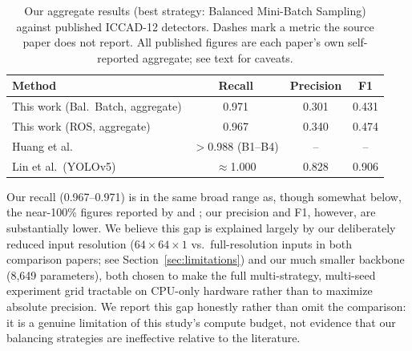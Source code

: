 \documentclass[conference]{IEEEtran}
\begin{document}
\begin{table}[H]
\centering
\caption{Our aggregate results (best strategy: Balanced Mini-Batch
Sampling) against published ICCAD-12 detectors. Dashes mark a metric
the source paper does not report. All published figures are each
paper's own self-reported aggregate; see text for caveats.}
\label{tab:published}
\begin{tabular}{lccc}
\toprule
Method & Recall & Precision & F1 \\
\midrule
This work (Bal.\ Batch, aggregate) & 0.971 & 0.301 & 0.431 \\
This work (ROS, aggregate) & 0.967 & 0.340 & 0.474 \\
Huang et al.\ \cite{huang2021enhancements} & $>$0.988 (B1--B4) & -- & -- \\
Lin et al.\ (YOLOv5) \cite{lin2025yolov5} & $\approx$1.000 & 0.828 & 0.906 \\
\bottomrule
\end{tabular}
\end{table}

Our recall (0.967--0.971) is in the same broad range as, though
somewhat below, the near-100\% figures reported by
\cite{huang2021enhancements} and \cite{lin2025yolov5}; our precision
and F1, however, are substantially lower. We believe this gap is
explained largely by our deliberately reduced input resolution
($64{\times}64{\times}1$ vs.\ full-resolution inputs in both
comparison papers; see Section~\ref{sec:limitations}) and our much
smaller backbone (8{,}649 parameters), both chosen to make the full
multi-strategy, multi-seed experiment grid tractable on CPU-only
hardware rather than to maximize absolute precision. We report this
gap honestly rather than omit the comparison: it is a genuine
limitation of this study's compute budget, not evidence that our
balancing strategies are ineffective relative to the literature.
\end{document}
